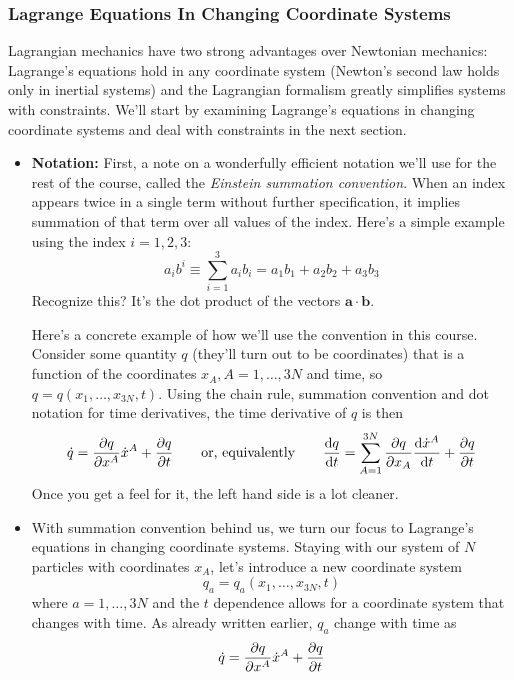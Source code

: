 \documentclass[11pt, a4paper]{article}
\newcommand{\eqtext}[1]{\qquad \text{#1} \qquad}
\begin{document}
\subsubsection{Lagrange Equations In Changing Coordinate Systems}
Lagrangian mechanics have two strong advantages over Newtonian mechanics: Lagrange's equations hold in any coordinate system (Newton's second law holds only in inertial systems) and the Lagrangian formalism greatly simplifies systems with constraints.  We'll start by examining Lagrange's equations in changing coordinate systems and deal with constraints in the next section.
\begin{itemize}
	\item \textbf{Notation:} First, a note on a wonderfully efficient notation we'll use for the rest of the course, called the \textit{Einstein summation convention}. When an index appears twice in a single term without further specification, it implies summation of that term over all values of the index. Here's a simple example using the index $ i = 1, 2, 3 $:
	\begin{equation*}
		a_{i}b^{i} \equiv \sum_{i = 1}^{3} a_{i}b_{i} = a_{1}b_{1} + a_{2}b_{2} + a_{3}b_{3}
	\end{equation*}
	Recognize this? It's the dot product of the vectors $ \bm{a} \cdot \bm{b} $.
	
	Here's a concrete example of how we'll use the convention in this course. Consider some quantity $ q $ (they'll turn out to be coordinates) that is a function of the coordinates $ x_{A}, A = 1, \ldots, 3N $ and time, so $ q = q(x_{1}, \ldots, x_{3N}, t) $. Using the chain rule, summation convention and dot notation for time derivatives, the time derivative of $ q $ is then
	\begin{equation*}
		\dot{q} = \pdv{q}{x^{A}} \dot{x}^{A} + \pdv{q}{t} \eqtext{or, equivalently} \dv{q}{t} = \sum_{A = 1}^{3N} \pdv{q}{x_A} \dv{\dot{x}^{A}}{t} + \pdv{q}{t}
	\end{equation*}
	Once you get a feel for it, the left hand side is a lot cleaner.
	
	\item With summation convention behind us, we turn our focus to Lagrange's equations in changing coordinate systems. Staying with our system of $ N $ particles with coordinates $ x_{A} $, let's introduce a new coordinate system
	\begin{equation*}
		q_{a} = q_{a}(x_{1}, \ldots, x_{3N}, t)
	\end{equation*}
	where $ a = 1, \ldots, 3N $ and the $ t $ dependence allows for a coordinate system that changes with time. As already written earlier, $ q_{a} $ change with time as
	\begin{equation*}
		\dot{q} = \pdv{q}{x^{A}} \dot{x}^{A} + \pdv{q}{t}
	\end{equation*}
	

\end{itemize}
\end{document}
